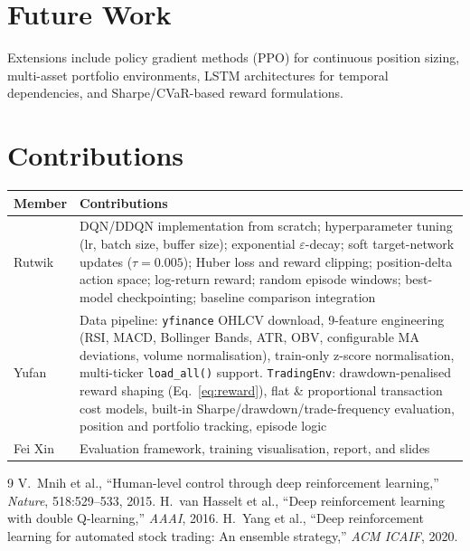 \documentclass[11pt,twocolumn]{article}
\begin{document}
\section{Future Work}

Extensions include policy gradient methods (PPO) for continuous position sizing, multi-asset portfolio environments, LSTM architectures for temporal dependencies, and Sharpe/CVaR-based reward formulations.

\section{Contributions}

\begin{table}[H]
\centering
\small
\begin{tabular}{p{} p{}}
\toprule
\textbf{Member} & \textbf{Contributions} \\
\midrule
Rutwik &
DQN/DDQN implementation from scratch; hyperparameter tuning (lr, batch size, buffer size); exponential $\varepsilon$-decay; soft target-network updates ($\tau{=}0.005$); Huber loss and reward clipping; position-delta action space; log-return reward; random episode windows; best-model checkpointing; baseline comparison integration \\
\midrule
Yufan &
Data pipeline: \texttt{yfinance} OHLCV download, 9-feature engineering (RSI, MACD, Bollinger Bands, ATR, OBV, configurable MA deviations, volume normalisation), train-only z-score normalisation, multi-ticker \texttt{load\_all()} support.
\texttt{TradingEnv}: drawdown-penalised reward shaping (Eq.~\ref{eq:reward}), flat \& proportional transaction cost models, built-in Sharpe/drawdown/trade-frequency evaluation, position and portfolio tracking, episode logic \\
\midrule
Fei Xin &
Evaluation framework, training visualisation, report, and slides \\
\bottomrule
\end{tabular}
\end{table}

\begin{thebibliography}{9}
V.~Mnih et al., ``Human-level control through deep reinforcement learning,'' \emph{Nature}, 518:529--533, 2015.
H.~van Hasselt et al., ``Deep reinforcement learning with double Q-learning,'' \emph{AAAI}, 2016.
H.~Yang et al., ``Deep reinforcement learning for automated stock trading: An ensemble strategy,'' \emph{ACM ICAIF}, 2020.
\end{thebibliography}
\end{document}

